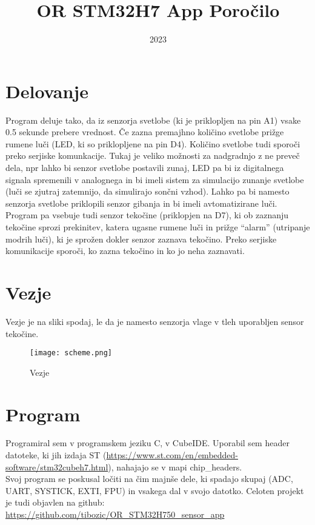 \documentclass{article}
\author{}
\title{OR STM32H7 App Poro\v{c}ilo}
\date{2023}
\begin{document}
\maketitle

\tableofcontents

\clearpage


\section{Delovanje}
\noindent
Program deluje tako, da iz senzorja svetlobe (ki je priklopljen na pin
A1) vsake 0.5 sekunde prebere vrednost. \v{C}e zazna premajhno
koli\v{c}ino svetlobe pri\v{z}ge rumene lu\v{c}i (LED, ki so priklopljene
na pin D4). Koli\v{c}ino svetlobe tudi sporo\v{c}i preko serjiske
komunkacije. Tukaj je veliko mo\v{z}nosti za nadgradnjo z ne
preve\v{c} dela, npr lahko bi senzor svetlobe postavili zunaj, LED pa
bi iz digitalnega signala spremenili v analognega in bi imeli sistem
za simulacijo zunanje svetlobe (lu\v{c}i se zjutraj zatemnijo, da
simulirajo son\v{c}ni vzhod). Lahko pa bi namesto senzorja svetlobe
priklopili senzor gibanja in bi imeli avtomatizirane lu\v{c}i. \\

\noindent
Program pa vsebuje tudi senzor teko\v{c}ine (priklopjen na D7), ki
ob zaznanju teko\v{c}ine sprozi prekinitev, katera ugasne rumene
lu\v{c}i in pri\v{z}ge ``alarm'' (utripanje modrih lu\v{c}i), ki je
spro\v{z}en dokler senzor zaznava teko\v{c}ino. Preko serjiske
komunikacije sporo\v{c}i, ko zazna teko\v{c}ino in ko jo neha
zaznavati.

\section{Vezje}
\noindent
Vezje je na sliki spodaj, le da je namesto senzorja vlage v tleh
uporabljen sensor teko\v{c}ine.

\begin{figure}[H]
	\begin{center}
	  \texttt{[image: scheme.png]}
	\end{center}
	\caption{Vezje}
\end{figure}

\section{Program}
\noindent
Programiral sem v programskem jeziku C, v CubeIDE. Uporabil sem
header datoteke, ki jih izdaja ST
(\href{https://www.st.com/en/embedded-software/stm32cubeh7.html}
{https://www.st.com/en/embedded-software/stm32cubeh7.html}), nahajajo
se v mapi chip\_headers. \\
Svoj program se poskusal lo\v{c}iti na \v{c}im majn\v{s}e dele, ki
spadajo skupaj (ADC, UART, SYSTICK, EXTI, FPU) in vsakega dal v svojo
datotko. Celoten projekt je tudi objavlen na github:
\href{https://github.com/tibozic/OR\_STM32H750\_sensor\_app}
{https://github.com/tibozic/OR\_STM32H750\_sensor\_app}
\end{document}
